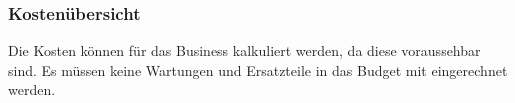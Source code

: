 \subsubsection{Kostenübersicht}
Die Kosten können für das Business kalkuliert werden, da diese voraussehbar sind.
Es müssen keine Wartungen und Ersatzteile in das Budget mit eingerechnet werden.



